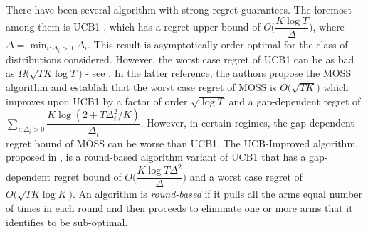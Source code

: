 	There have been several algorithm with strong regret guarantees. The foremost among them is UCB1 \cite{auer2002finite}, which has a regret upper bound of $O\bigg(\dfrac{K\log T}{\Delta}\bigg)$, where $\Delta = \min_{i:\Delta_i>0} \Delta_i$. This result is asymptotically order-optimal for the class of distributions considered. However, the worst case regret of UCB1  can be as bad as $\Omega \bigg(\sqrt{TK\log T}\bigg)$ - see \cite{audibert2009minimax}.  In the latter reference, the authors propose the MOSS algorithm and establish that the worst case regret of MOSS is $O\bigg(\sqrt{TK}\bigg)$ which improves upon UCB1 by a factor of order $\sqrt{\log T}$ and a gap-dependent regret of $\sum_{i:\Delta_{i}>0}\dfrac{K\log(2+T\Delta_{i}^{2}/K)}{\Delta_{i}}$. However, in certain regimes, the gap-dependent regret bound of MOSS can be worse than UCB1. The UCB-Improved algorithm, proposed in \cite{auer2010ucb}, is a round-based algorithm variant of UCB1 that has a gap-dependent regret bound of $O\bigg(\dfrac{K\log T\Delta^{2}}{\Delta}\bigg)$ and a worst case regret of $O\bigg(\sqrt{TK\log K}\bigg)$. An algorithm is \textit{round-based} if it pulls all the arms equal number of times in each round and then proceeds to eliminate one or more arms that it identifies to be sub-optimal. 
	
